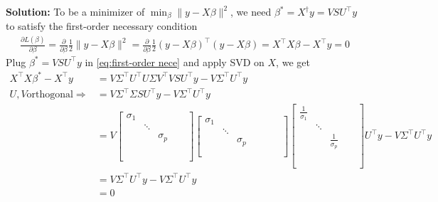 \documentclass[11pt]{article}
\theoremstyle{plain} %
\newenvironment{solution}
{\color{C2}\normalfont\begin{framed}\begingroup\textbf{Solution:} }
  {\endgroup\end{framed}}
\theoremstyle{remark}
\begin{document}
\begin{solution}
    To be a minimizer of $\min_{\beta}\|y-X \beta\|^2$, we need $\beta^* = X^\dagger y = V S U^\top y$ to satisfy the first-order necessary condition
    \begin{align}
        \frac{\partial L(\beta)}{\partial \beta} = \frac{\partial}{\partial \beta} \frac{1}{2}\|y-X \beta\|^2 = \frac{\partial}{\partial \beta} \frac{1}{2} (y-X \beta)^\top (y-X \beta) = X^\top X \beta - X^\top y = 0 \label{eq:first-order nece}
    \end{align}
    Plug $\beta^* = V S U^\top y$ in \cref{eq:first-order nece} and apply SVD on $X$, we get
    \begin{align*}
    X^\top X \beta^* - X^\top y &= V\Sigma^\top U^\top U\Sigma V^\top V S U^\top y - V\Sigma^\top U^\top y\\
    U, V \text{orthogonal}\Longrightarrow 
    &=V\Sigma^\top \Sigma  S U^\top y - V\Sigma^\top U^\top y \\
    &= V\begin{bmatrix}
        \sigma_1 & & & &\\
        & \ddots &  &  &\\
         & & \sigma_p & &\\
         & &  & &\\
         &  &  &  &\\
         &  &  &  &\\
    \end{bmatrix} \begin{bmatrix}
        \sigma_1 & & & & & &\\
        & \ddots & & & & &\\
         & & \sigma_p & & & &\\
         & &  & & & & \\
         & &  & & & & 
    \end{bmatrix}  \begin{bmatrix}
        \frac{1}{\sigma_1} & & & &\\
        & \ddots &  &  &\\
         & & \frac{1}{\sigma_p} & &\\
         & &  & &\\
         &  &  &  &\\
         &  &  &  &\\
    \end{bmatrix} U^\top y - V\Sigma^\top U^\top y\\
    &= V\Sigma^\top  U^\top y - V\Sigma^\top U^\top y \\
    &= 0
    \end{align*}


\end{solution}
\end{document}
